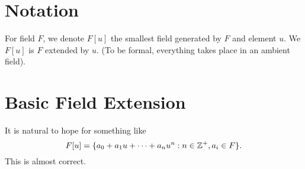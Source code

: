 \section{Notation}
For field $F$, we denote $F[u]$ the smallest field generated by $F$ and element $u$. We $F[u]$ is $F$ extended by $u$. (To be formal, everything takes place in an ambient field).

\section{Basic Field Extension}
It is natural to hope for something like
\[
    F[u] = \{a_0 + a_1u + \dots + a_nu^n : n \in {\mathbb Z}^+, a_i \in F\}.
\]
This is almost correct.
